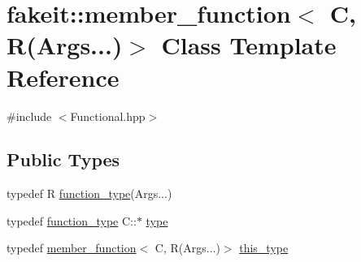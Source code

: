 \hypertarget{classfakeit_1_1member__function_3_01C_00_01R_07Args_8_8_8_08_4}{}\section{fakeit\+::member\+\_\+function$<$ C, R(Args...)$>$ Class Template Reference}
\label{classfakeit_1_1member__function_3_01C_00_01R_07Args_8_8_8_08_4}


{\ttfamily \#include $<$Functional.\+hpp$>$}

\subsection*{Public Types}
\begin{DoxyCompactItemize}
\item 
typedef R \mbox{\hyperlink{classfakeit_1_1member__function_3_01C_00_01R_07Args_8_8_8_08_4_adec3af2f7a23e90ba69d1e7d65369908}{function\+\_\+type}}(Args...)
\item 
typedef \mbox{\hyperlink{classfakeit_1_1member__function_3_01C_00_01R_07Args_8_8_8_08_4_adec3af2f7a23e90ba69d1e7d65369908}{function\+\_\+type}} C\+::$\ast$ \mbox{\hyperlink{classfakeit_1_1member__function_3_01C_00_01R_07Args_8_8_8_08_4_a21761d9e5d16d880e677d266fc331aaa}{type}}
\item 
typedef \mbox{\hyperlink{classfakeit_1_1member__function}{member\+\_\+function}}$<$ C, R(Args...)$>$ \mbox{\hyperlink{classfakeit_1_1member__function_3_01C_00_01R_07Args_8_8_8_08_4_a2f0619303f6394749b3d110408a6945a}{this\+\_\+type}}
\end{DoxyCompactItemize}
